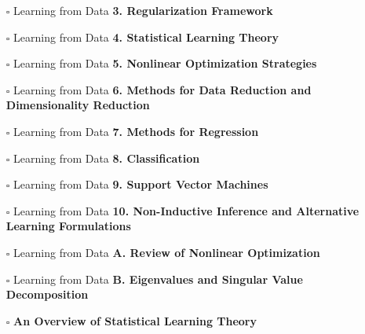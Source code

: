 \documentclass[a4, landscape, 12pt]{article}
\newcommand{\checkbox}{$\square$}%
\begin{document}
\begin{itemize}
{}
\item [\checkbox]  Learning from Data \textbf{ 3. Regularization Framework
}
\item [\checkbox]  Learning from Data \textbf{ 4. Statistical Learning Theory
}
\item [\checkbox]  Learning from Data \textbf{ 5. Nonlinear Optimization Strategies
}
\item [\checkbox]  Learning from Data \textbf{ 6. Methods for Data Reduction and Dimensionality Reduction
}
\item [\checkbox]  Learning from Data \textbf{ 7. Methods for Regression
}
\item [\checkbox]  Learning from Data \textbf{ 8. Classification
}
\item [\checkbox]  Learning from Data \textbf{ 9. Support Vector Machines
}
\item [\checkbox]  Learning from Data \textbf{ 10. Non-Inductive Inference and Alternative Learning Formulations
}
\item [\checkbox]  Learning from Data \textbf{ A. Review of Nonlinear Optimization
}
\item [\checkbox]  Learning from Data \textbf{ B. Eigenvalues and Singular Value Decomposition
}
\item [\checkbox]  \textbf{An Overview of Statistical Learning Theory}


\end{itemize}
\end{document}
